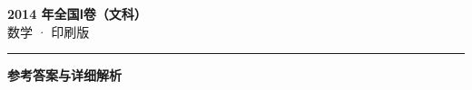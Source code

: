 \documentclass[zihao=5, a4paper]{ctexart}
\begin{document}
\begin{center}
  {\Large\bfseries 2014 年全国Ⅰ卷（文科）}\\[4pt]
  {\large 数学 · 印刷版}
\end{center}
\medskip
{}

\par\bigskip\hrule\bigskip
{}
\begin{center}{\large\bfseries 参考答案与详细解析}\end{center}
\smallskip

\end{document}
